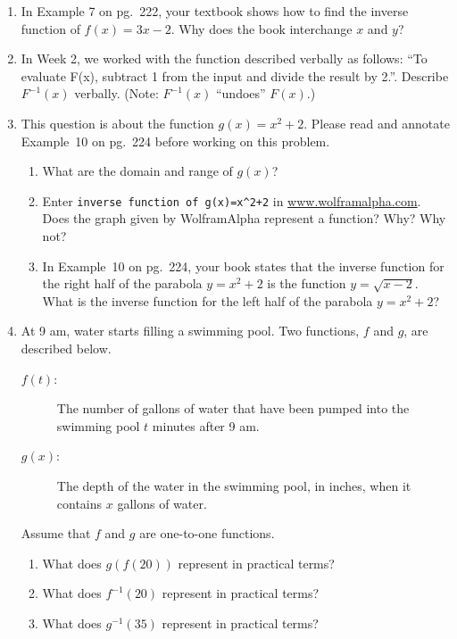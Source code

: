 \documentclass[12pt,dvipsnames]{article}
\begin{document}
\begin{enumerate}[label=\arabic*., leftmargin=2\parindent,
labelindent=\parindent, labelsep=*]
\item In Example 7 on pg.~222, your textbook shows how to find the inverse function of  $f(x)=3x-2$. Why does the book interchange $x$ and $y$?

\item In Week 2, we worked with the function described verbally as follows: \enquote{To evaluate F(x), subtract 1 from the input and divide the result by 2.}. Describe $\displaystyle F^{-1}(x)$ verbally. (Note: $\displaystyle F^{-1}(x)$ \enquote{undoes} $F(x)$.) 

\item This question is about the function $\displaystyle g(x)=x^2+2$. Please read and annotate Example~10 on pg.~224 before working on this problem.
\begin{enumerate}[labelindent=\parindent,leftmargin=*]
\item What are the domain and range of $g(x)$?
\item Enter {\tt{inverse function of g(x)=x\^{}2+2}} in \url{www.wolframalpha.com}. Does the graph given by WolframAlpha represent a function? Why? Why not?
\item In Example~10 on pg.~224, your book states that the inverse function for the right half of the parabola $\displaystyle y=x^2+2$ is the function $\displaystyle y=\sqrt{x-2}$. What is the inverse function for the left half of the parabola $\displaystyle y=x^2+2$?
\end{enumerate}

\item  At 9 am, water starts filling a swimming pool.
Two functions, $f$ and $g$, are described below.
\begin{description}
\item[$f(t)$:] The number of gallons of water that have been pumped  into the swimming pool $t$ minutes after 9 am.
\item[$g(x)$:] The depth of the water in the swimming pool, in inches, when it contains $x$ gallons of water.
\end{description}
Assume that $f$ and $g$ are one-to-one functions. 
\begin{enumerate}[labelindent=\parindent,leftmargin=*]
\item What does $\displaystyle g(f(20))$ represent in practical terms?
\item What does $\displaystyle f^{-1}(20)$ represent in practical terms?
\item What does $\displaystyle g^{-1}(35)$ represent in practical terms?  
\end{enumerate}
					

\end{enumerate}
\end{document}
